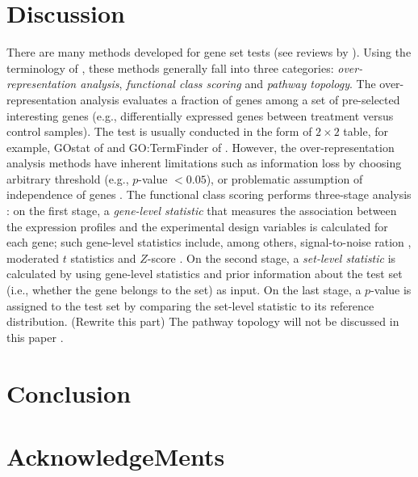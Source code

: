 \documentclass[useAMS,usenatbib, galley]{biom}
\begin{document}
	\section{Discussion}
	
	There are many methods developed for gene set tests (see reviews by \citep{huang2009bioinformatics, khatri2012ten, tarca2013comparison}). Using the terminology of \cite{khatri2012ten}, these methods generally fall into three categories: \textit{over-representation analysis}, \textit{functional class scoring} and \textit{pathway topology}. The over-representation analysis evaluates a fraction of genes among a set of pre-selected interesting genes (e.g., differentially expressed genes between treatment versus control samples). The test is usually conducted in the form of $2\times 2$ table, for example, GOstat of \cite{klebanov2007multivariate} and GO:TermFinder of \cite{tian2005discovering}. However, the over-representation analysis methods have inherent limitations such as information loss by choosing arbitrary threshold (e.g., $p$-value $< 0.05$), or problematic assumption of independence of genes \citep{goeman2007analyzing, wu2012camera}. The functional class scoring performs three-stage analysis \citep{khatri2012ten}: on the first stage, a \textit{gene-level statistic} that measures the association between the expression profiles and the experimental design variables is calculated for each gene; such gene-level statistics include, among others, signal-to-noise ration \citep{subramanian2005gene}, moderated $t$ statistics \citep{Smyth2004moderated} and  $Z$-score \citep{efron2007correlation}. On the second stage, a \textit{set-level statistic} is calculated by using gene-level statistics and prior information about the test set (i.e., whether the gene belongs to the set) as input. On the last stage, a $p$-value is assigned to the test set by comparing the set-level statistic to its reference distribution.  (Rewrite this part)		 
	The pathway topology will not be discussed in this paper \citep{khatri2012ten,tarca2013comparison}.
	
	\section{Conclusion}\label{section:conclusion}
	
	\section{AcknowledgeMents}\label{section:acknowledgement}
	
\end{document}
